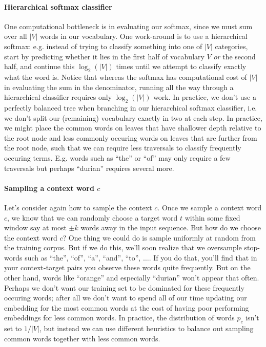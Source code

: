 \documentclass[12pt]{article}
\begin{document}
\paragraph{Hierarchical softmax classifier}
One computational bottleneck is in evaluating our softmax, since we must sum over all $|V|$ words in our vocabulary. One work-around is to use a hierarchical softmax: e.g. instead of trying to classify something into one of $|V|$ categories, start by predicting whether it lies in the first half of vocabulary $V$ \emph{or} the second half, and continue this $\log_2(|V|)$ times until we attempt to classify exactly what the word is. Notice that whereas the softmax has computational cost of $|V|$ in evaluating the sum in the denominator, running all the way through a hierarchical classifier requires only $\log_2(|V|)$ work. In practice, we don't use a perfectly balanced tree when branching in our hierarchical softmax classifier, i.e. we don't split our (remaining) vocabulary exactly in two at each step. In practice, we might place
the common words on leaves that have shallower depth relative to the root node and less commonly occuring words on leaves that are further from the root node, such that we can require less traversals to classify frequently occuring terms.
E.g. words such as ``the'' or ``of'' may only require a few traversals but perhaps ``durian'' requires several more.

\paragraph{Sampling a context word $c$}
Let's consider again how to sample the context $c$. Once we sample a context word $c$, we know that we can randomly choose a target word $t$ within some fixed window say at most $\pm k$ words away in the input sequence. But how do we choose the context word $c$? One thing we could do is sample uniformly at random from the training corpus. But if we do this, we'll soon realize that we oversample stop-words such as ``the'', ``of'', ``a'', ``and'', ``to'', $\ldots$. If you do that, you'll find that in your context-target pairs you observe these words quite frequently. But on the other hand, words like ``orange'' and especially ``durian'' won't appear that often. Perhaps we don't want our training set to be dominated for these frequently occuring words; after all we don't want to spend all of our time updating our embedding for the most common words at the cost of having poor performing embeddings for less common words. In practice, the distribution of words $p_c$ isn't set to $1/|V|$, but instead we can use different heuristics to balance out sampling common words together with less common words.
\end{document}
